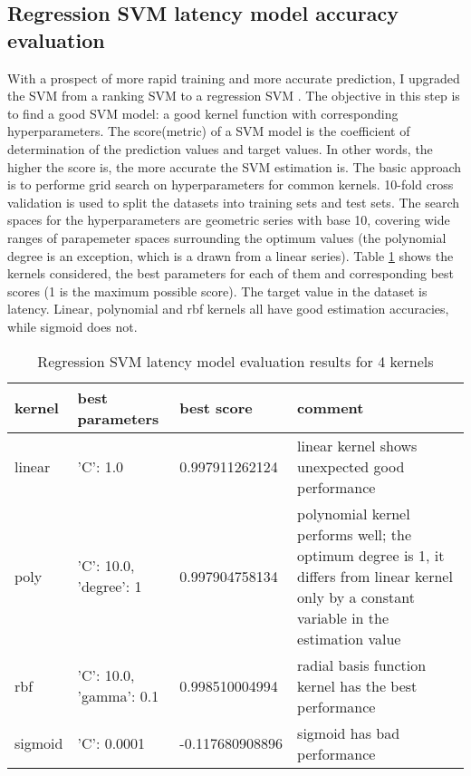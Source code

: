 \documentclass[12pt]{article}
\theoremstyle{definition}
\begin{document}
\subsection{Regression SVM latency model accuracy evaluation}
With a prospect of more rapid training and more accurate prediction, I upgraded the SVM from a ranking SVM to a regression SVM \cite{chang2011libsvm}. The objective in this step is to find a good SVM model: a good kernel function with corresponding hyperparameters. The score(metric) of a SVM model is the coefficient of determination of the prediction values and target values. In other words, the higher the score is, the more accurate the SVM estimation is. The basic approach is to performe grid search on hyperparameters for common kernels. 10-fold cross validation is used to split the datasets into training sets and test sets. The search spaces for the hyperparameters are geometric series with base 10, covering wide ranges of parapemeter spaces surrounding the optimum values (the polynomial degree is an exception, which is a drawn from a linear series). Table \ref{tab:latency} shows the kernels considered, the best parameters for each of them and corresponding best scores (1 is the maximum possible score). The target value in the dataset is latency. Linear, polynomial and rbf kernels all have good estimation accuracies, while sigmoid does not.
\begin{table}[htb]
  \centering
  \begin{tabularx}{\textwidth}{|l|l|l|X|} \hline
    kernel & best parameters & best score & comment \\ \hline
    linear & {'C': 1.0} & 0.997911262124 & linear kernel shows unexpected good performance \\ \hline
    poly & {'C': 10.0, 'degree': 1} & 0.997904758134 & polynomial kernel performs well; the optimum degree is 1, it differs from linear kernel only by a constant variable in the estimation value \\ \hline
    rbf & {'C': 10.0, 'gamma': 0.1} & 0.998510004994 & radial basis function kernel has the best performance \\ \hline
    sigmoid & {'C': 0.0001} & -0.117680908896 & sigmoid has bad performance \\ \hline
  \end{tabularx}
  \caption{Regression SVM latency model evaluation results for 4 kernels}
  \label{tab:latency}
\end{table}
\end{document}
